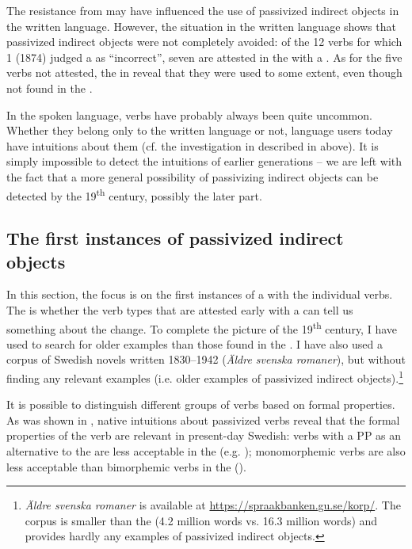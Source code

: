 \documentclass[output=paper]{langscibook}
\begin{document}
The resistance from  may have influenced the use of passivized indirect objects in the written language. However, the situation in the written language shows that passivized indirect objects were not completely avoided: of the 12 verbs for which  1 (1874) judged a  as “incorrect”, seven are attested in the  with a . As for the five verbs not attested, the  in  reveal that they were used to some extent, even though not found in the .



In the spoken language,  verbs have probably always been quite uncommon. Whether they belong only to the written language or not, language users today have intuitions about them (cf. the investigation in \citealt{HaddicanHolmberg2019} described in  above). It is simply impossible to detect the intuitions of earlier generations – we are left with the fact that a more general possibility of passivizing indirect objects can be detected by the 19\textsuperscript{th} century, possibly the later part.


\subsection{The first instances of passivized indirect objects}\label{sec:falk:3.7}\largerpage


In this section, the focus is on the first instances of a  with the individual verbs. The  is whether the verb types that are attested early with a  can tell us something about the change. To complete the picture of the 19\textsuperscript{th} century, I have used  to search for older examples than those found in the . I have also used a corpus of Swedish novels written 1830–1942 (\textit{Äldre svenska romaner}), but without finding any relevant examples (i.e. older examples of passivized indirect objects).\footnote{\textit{Äldre svenska romaner} is available at \url{https://spraakbanken.gu.se/korp/}. The corpus is smaller than the  (4.2 million words vs. 16.3 million words) and provides hardly any examples of passivized indirect objects.}


It is possible to distinguish different groups of verbs based on formal properties. As was shown in , native  intuitions about passivized  verbs reveal that the formal properties of the verb are relevant in present-day Swedish: verbs with a PP as an alternative to the  are less acceptable in the  (e.g. \citealt{Anward1989}); monomorphemic verbs are also less acceptable than bimorphemic verbs in the  (\citealt{HolmbergPlatzack1995,HaddicanHolmberg2019}).
\end{document}
